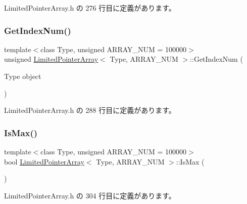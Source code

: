 Limited\+Pointer\+Array.\+h の 276 行目に定義があります。

\mbox{\label{class_limited_pointer_array_a2b9d42b57662f29f357b2faf1793aa66}} 
\subsubsection{\texorpdfstring{Get\+Index\+Num()}{GetIndexNum()}}
{\footnotesize\ttfamily template$<$class Type, unsigned A\+R\+R\+A\+Y\+\_\+\+N\+UM = 100000$>$ \\
unsigned \mbox{\hyperlink{class_limited_pointer_array}{Limited\+Pointer\+Array}}$<$ Type, A\+R\+R\+A\+Y\+\_\+\+N\+UM $>$\+::Get\+Index\+Num (\begin{DoxyParamCaption}\item[{Type}]{object }\end{DoxyParamCaption})\hspace{0.3cm}{\ttfamily [inline]}}



 Limited\+Pointer\+Array.\+h の 288 行目に定義があります。

\mbox{\label{class_limited_pointer_array_a8bd3a7ea969f307c35934a1bf2803b40}} 
\subsubsection{\texorpdfstring{Is\+Max()}{IsMax()}}
{\footnotesize\ttfamily template$<$class Type, unsigned A\+R\+R\+A\+Y\+\_\+\+N\+UM = 100000$>$ \\
bool \mbox{\hyperlink{class_limited_pointer_array}{Limited\+Pointer\+Array}}$<$ Type, A\+R\+R\+A\+Y\+\_\+\+N\+UM $>$\+::Is\+Max (\begin{DoxyParamCaption}{ }\end{DoxyParamCaption})\hspace{0.3cm}{\ttfamily [inline]}}



 Limited\+Pointer\+Array.\+h の 304 行目に定義があります。

\mbox{\label{class_limited_pointer_array_a7cf64a1731ab6d0d63182b6c223fae0b}} 
